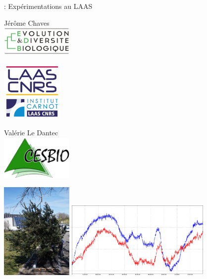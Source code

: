 \documentclass[12pt]{beamer}
\begin{document}
                \begin{frame}{\subsubsecname: Expérimentations au LAAS}
                    \vspace{-0.5cm}
                    \begin{minipage}[t][1in][t]{3.5cm}\vspace{0pt}
                        Jérôme Chaves \\
                        \includegraphics[width=3.5cm]{img/edb.jpg}
                    \end{minipage}
                    \begin{minipage}[t][1in][t]{3.5cm}\vspace{0pt}
                        \includegraphics[width=3cm]{img/laas.png}
                    \end{minipage}
                    \begin{minipage}[t][1in][t]{3.5cm}\vspace{0pt}
                        Valérie Le Dantec \\
                        \includegraphics[width=3.5cm]{img/cesbio.png}
                    \end{minipage}

                    \includegraphics[width=3.5cm]{img/arbre_laas.jpg}
                    \includegraphics[width=7cm]{img/granier.png}
                \end{frame}
\end{document}
